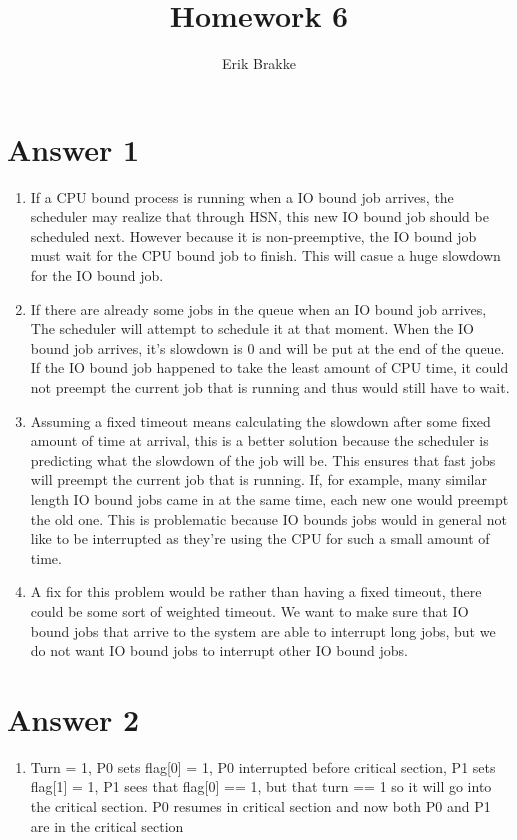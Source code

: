 \documentclass[11pt]{article}
\theoremstyle{definition}
\begin{document}
\title{Homework 6}
\author{Erik Brakke}
\maketitle

\thispagestyle{fancy}
 
 
\section*{Answer 1}
\begin{enumerate}
	\item If a CPU bound process is running when a IO bound job arrives, the scheduler may realize that through HSN, this new IO bound job should be scheduled next.  However because it is non-preemptive,
	the IO bound job must wait for the CPU bound job to finish. This will casue a huge slowdown for the IO bound job.

	\item If there are already some jobs in the queue when an IO bound job arrives, The scheduler will attempt to schedule it at that moment.  When the IO bound job arrives, it's slowdown is 0 and will be put at the end of the queue.  If the IO bound job happened to take the least amount of CPU time, it could not preempt the current job that is running and thus would still have to wait.

	\item Assuming a fixed timeout means calculating the slowdown after some fixed amount of time at arrival, this is a better solution because the scheduler is predicting what the slowdown of the job will be.
	This ensures that fast jobs will preempt the current job that is running.  If, for example, many similar length IO bound jobs came in at the same time, each new one would preempt the old one.  This is problematic because IO bounds jobs would in general not like to be interrupted as they're using the CPU for such a small amount of time.

	\item A fix for this problem would be rather than having a fixed timeout, there could be some sort of weighted timeout.  We want to make sure that IO bound jobs that arrive to the system are able to interrupt long jobs, but we do not want IO bound jobs to interrupt other IO bound jobs.  
\end{enumerate}

\section*{Answer 2}
\begin{enumerate}
	\item Turn = 1, P0 sets flag[0] = 1, P0 interrupted before critical section, P1 sets flag[1] = 1, P1 sees that flag[0] == 1, but that turn == 1 so it will go into the critical section.  P0 resumes in critical section and now both P0 and P1 are in the critical section
\end{enumerate}
\end{document}
